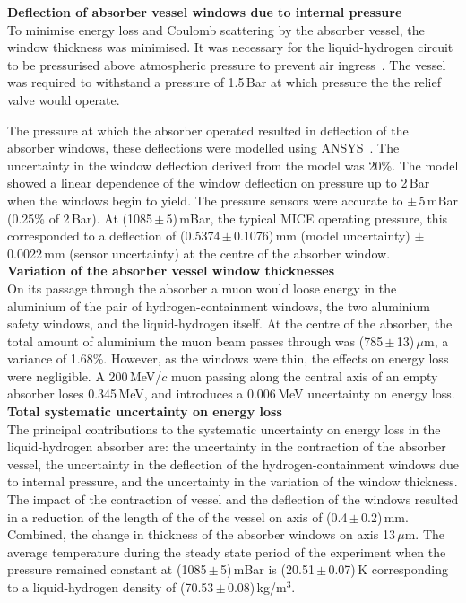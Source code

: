 \noindent\textbf{Deflection of absorber vessel windows due to internal
  pressure} \\
\noindent
To minimise energy loss and Coulomb scattering by the absorber vessel,
the window thickness was minimised.
It was necessary for the liquid-hydrogen circuit to be pressurised
above atmospheric pressure to prevent air
ingress~\cite{1748-0221-13-09-T09008}\cite{Ishimoto}. 
The vessel was required to withstand a pressure of 1.5\,Bar at which
pressure the the relief valve would operate.

The pressure at which the absorber operated resulted in deflection of
the absorber windows, these deflections were modelled using
ANSYS~\cite{NOTE155}.
The uncertainty in the window deflection derived from the model was
20\%.
The model showed a linear dependence of the window deflection on
pressure up to 2\,Bar when the windows begin to yield.
The pressure sensors were accurate to $\mathrm{\pm}$\,5\,mBar
(0.25\% of 2\,Bar).
At (1085\,$\mathrm{\pm}$\,5)\,mBar, the typical MICE operating
pressure, this corresponded to a deflection of
(0.5374\,$\mathrm{\pm}$\,0.1076)\,mm (model uncertainty)
$\mathrm{\pm}$\,0.0022\,mm (sensor uncertainty) at the centre of the
absorber window. \\

\noindent\textbf{Variation of the absorber vessel window thicknesses} \\
\noindent
On its passage through the absorber a muon would loose energy in the
aluminium of the pair of hydrogen-containment windows, the two
aluminium safety windows, and the liquid-hydrogen itself.
At the centre of the absorber, the total amount of aluminium the muon
beam passes through was (785\,$\mathrm{\pm}$\,13)\,$\mu$m, a variance
of 1.68\%.
However, as the windows were thin, the effects on energy loss were
negligible.
A 200\,MeV/$c$ muon passing along the central axis of an empty
absorber loses 0.345\,MeV, and introduces a 0.006\,MeV uncertainty
on energy loss.  \\

\noindent\textbf{Total systematic uncertainty on energy loss} \\
\noindent
The principal contributions to the systematic uncertainty on energy
loss in the liquid-hydrogen absorber are: the uncertainty in the
contraction of the absorber vessel, the uncertainty in the deflection
of the hydrogen-containment windows due to internal pressure, and the
uncertainty in the variation of the window thickness.
The impact of the contraction of vessel and the deflection of the
windows resulted in a reduction of the length of the of the vessel on
axis of (0.4\,$\mathrm{\pm}$\,0.2)\,mm.
Combined, the change in thickness of the absorber windows on axis
13\,$\mu$m.
The average temperature during the steady state period of the
experiment when the pressure remained constant at
(1085\,$\mathrm{\pm}$\,5)\,mBar is (20.51\,$\mathrm{\pm}$\,0.07)\,K
corresponding to a liquid-hydrogen density of
(70.53\,$\mathrm{\pm}$\,0.08)\,kg/m$^{3}$.

